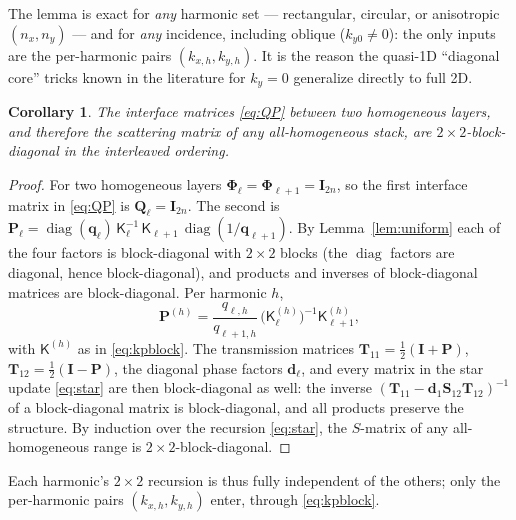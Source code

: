 \documentclass[11pt]{article}
\newtheorem{corollary}[theorem]{Corollary}
\theoremstyle{remark}
\newcommand{\kp}{\mathsf{K}}
\newcommand{\Ph}{\mathbf{\Phi}}
\newcommand{\fq}{\mathbf{q}}
\newcommand{\Id}{\mathbf{I}}
\DeclareMathOperator{\diag}{diag}
\begin{document}
The lemma is exact for \emph{any} harmonic set --- rectangular, circular, or
anisotropic $(n_x,n_y)$ --- and for \emph{any} incidence, including oblique
($k_{y0}\neq0$): the only inputs are the per-harmonic pairs $(k_{x,h},k_{y,h})$.
It is the reason the quasi-1D ``diagonal core'' tricks known in the literature
for $k_y=0$ generalize directly to full 2D.

\begin{corollary}\label{cor:suffix}
The interface matrices \eqref{eq:QP} between two homogeneous layers, and
therefore the scattering matrix of any all-homogeneous stack, are
$2\times2$-block-diagonal in the interleaved ordering.
\end{corollary}

\begin{proof}
For two homogeneous layers $\Ph_\ell=\Ph_{\ell+1}=\Id_{2n}$, so the first
interface matrix in \eqref{eq:QP} is $\mathbf{Q}_\ell=\Id_{2n}$. The second is
$\mathbf{P}_\ell=\diag(\fq_\ell)\,\kp_\ell^{-1}\,\kp_{\ell+1}\,
\diag(1/\fq_{\ell+1})$. By Lemma~\ref{lem:uniform} each of the four factors is
block-diagonal with $2\times2$ blocks (the $\diag$ factors are diagonal, hence
block-diagonal), and products and inverses of block-diagonal matrices are
block-diagonal. Per harmonic $h$,
\begin{equation}
\mathbf{P}^{(h)}
=\frac{q_{\ell,h}}{q_{\ell+1,h}}\,
\big(\kp_\ell^{(h)}\big)^{-1}\kp_{\ell+1}^{(h)},
\label{eq:Ph}
\end{equation}
with $\kp^{(h)}$ as in \eqref{eq:kpblock}. The transmission matrices
$\mathbf{T}_{11}=\tfrac12(\Id+\mathbf{P})$,
$\mathbf{T}_{12}=\tfrac12(\Id-\mathbf{P})$, the diagonal phase factors
$\mathbf{d}_\ell$, and every matrix in the star update \eqref{eq:star} are then
block-diagonal as well: the inverse
$(\mathbf{T}_{11}-\mathbf{d}_1\mathbf{S}_{12}\mathbf{T}_{12})^{-1}$ of a
block-diagonal matrix is block-diagonal, and all products preserve the
structure. By induction over the recursion \eqref{eq:star}, the $S$-matrix of
any all-homogeneous range is $2\times2$-block-diagonal.
\end{proof}

Each harmonic's $2\times2$ recursion is thus fully independent of the others;
only the per-harmonic pairs $(k_{x,h},k_{y,h})$ enter, through \eqref{eq:kpblock}.
\end{document}
